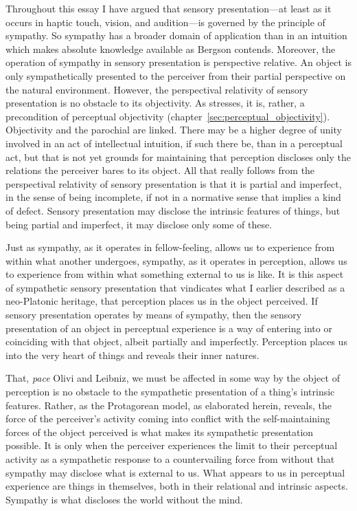 Throughout this essay I have argued that sensory presentation---at least as it occurs in haptic touch, vision, and audition---is governed by the principle of sympathy. So sympathy has a broader domain of application than in an intuition which makes absolute knowledge available as Bergson contends. Moreover, the operation of sympathy in sensory presentation is perspective relative. An object is only sympathetically presented to the perceiver from their partial perspective on the natural environment. However, the perspectival relativity of sensory presentation is no obstacle to its objectivity. As \citet{Merleau-Ponty:1967fj} stresses, it is, rather, a precondition of perceptual objectivity (chapter~\ref{sec:perceptual_objectivity}). Objectivity and the parochial are linked. There may be a higher degree of unity involved in an act of intellectual intuition, if such there be, than in a perceptual act, but that is not yet grounds for maintaining that perception discloses only the relations the perceiver bares to its object. All that really follows from the perspectival relativity of sensory presentation is that it is partial and imperfect, in the sense of being incomplete, if not in a normative sense that implies a kind of defect. Sensory presentation may disclose the intrinsic features of things, but being partial and imperfect, it may disclose only some of these.

Just as sympathy, as it operates in fellow-feeling, allows us to experience from within what another undergoes, sympathy, as it operates in perception, allows us to experience from within what something external to us is like. It is this aspect of sympathetic sensory presentation that vindicates what I earlier described as a neo-Platonic heritage, that perception places us in the object perceived. If sensory presentation operates by means of sympathy, then the sensory presentation of an object in perceptual experience is a way of entering into or coinciding with that object, albeit partially and imperfectly. Perception places us into the very heart of things and reveals their inner natures.

That, \emph{pace} Olivi and Leibniz, we must be affected in some way by the object of perception is no obstacle to the sympathetic presentation of a thing's intrinsic features. Rather, as the Protagorean model, as elaborated herein, reveals, the force of the perceiver's activity coming into conflict with the self-maintaining forces of the object perceived is what makes its sympathetic presentation possible. It is only when the perceiver experiences the limit to their perceptual activity as a sympathetic response to a countervailing force from without that sympathy may disclose what is external to us. What appears to us in perceptual experience are things in themselves, both in their relational and intrinsic aspects. Sympathy is what discloses the world without the mind.


